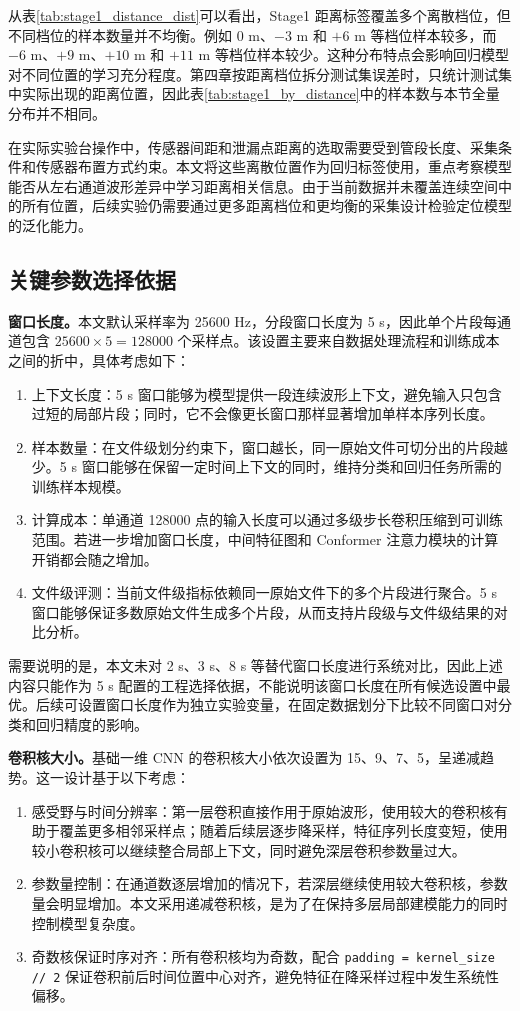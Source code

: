 从表\ref{tab:stage1_distance_dist}可以看出，Stage1 距离标签覆盖多个离散档位，但不同档位的样本数量并不均衡。例如 $0$ m、$-3$ m 和 $+6$ m 等档位样本较多，而 $-6$ m、$+9$ m、$+10$ m 和 $+11$ m 等档位样本较少。这种分布特点会影响回归模型对不同位置的学习充分程度。第四章按距离档位拆分测试集误差时，只统计测试集中实际出现的距离位置，因此表\ref{tab:stage1_by_distance}中的样本数与本节全量分布并不相同。

在实际实验台操作中，传感器间距和泄漏点距离的选取需要受到管段长度、采集条件和传感器布置方式约束。本文将这些离散位置作为回归标签使用，重点考察模型能否从左右通道波形差异中学习距离相关信息。由于当前数据并未覆盖连续空间中的所有位置，后续实验仍需要通过更多距离档位和更均衡的采集设计检验定位模型的泛化能力。

\subsection{关键参数选择依据}

\textbf{窗口长度。}本文默认采样率为 25600 Hz，分段窗口长度为 5 s，因此单个片段每通道包含 $25600 \times 5 = 128000$ 个采样点。该设置主要来自数据处理流程和训练成本之间的折中，具体考虑如下：

\begin{enumerate}
  \item 上下文长度：5 s 窗口能够为模型提供一段连续波形上下文，避免输入只包含过短的局部片段；同时，它不会像更长窗口那样显著增加单样本序列长度。
  \item 样本数量：在文件级划分约束下，窗口越长，同一原始文件可切分出的片段越少。5 s 窗口能够在保留一定时间上下文的同时，维持分类和回归任务所需的训练样本规模。
  \item 计算成本：单通道 128000 点的输入长度可以通过多级步长卷积压缩到可训练范围。若进一步增加窗口长度，中间特征图和 Conformer 注意力模块的计算开销都会随之增加。
  \item 文件级评测：当前文件级指标依赖同一原始文件下的多个片段进行聚合。5 s 窗口能够保证多数原始文件生成多个片段，从而支持片段级与文件级结果的对比分析。
\end{enumerate}

需要说明的是，本文未对 2 s、3 s、8 s 等替代窗口长度进行系统对比，因此上述内容只能作为 5 s 配置的工程选择依据，不能说明该窗口长度在所有候选设置中最优。后续可设置窗口长度作为独立实验变量，在固定数据划分下比较不同窗口对分类和回归精度的影响。

\textbf{卷积核大小。}基础一维 CNN 的卷积核大小依次设置为 15、9、7、5，呈递减趋势。这一设计基于以下考虑：

\begin{enumerate}
  \item 感受野与时间分辨率：第一层卷积直接作用于原始波形，使用较大的卷积核有助于覆盖更多相邻采样点；随着后续层逐步降采样，特征序列长度变短，使用较小卷积核可以继续整合局部上下文，同时避免深层卷积参数量过大。
  \item 参数量控制：在通道数逐层增加的情况下，若深层继续使用较大卷积核，参数量会明显增加。本文采用递减卷积核，是为了在保持多层局部建模能力的同时控制模型复杂度。
  \item 奇数核保证时序对齐：所有卷积核均为奇数，配合 \texttt{padding = kernel\_size // 2} 保证卷积前后时间位置中心对齐，避免特征在降采样过程中发生系统性偏移。
\end{enumerate}

